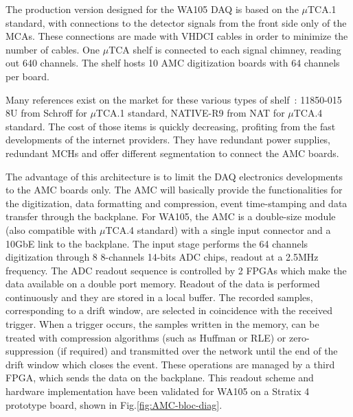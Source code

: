 The production version designed for the WA105 DAQ is based on the $\mu$TCA.1 standard, with connections to the detector signals from the front side only of the MCAs. These connections are made with VHDCI cables in order to minimize the number of cables. One $\mu$TCA shelf is connected to each signal chimney, reading out 640 channels.  The shelf hosts 10 AMC digitization boards with 64 channels per board.


Many references exist on the market for these various types of shelf~: 11850-015 8U from Schroff for $\mu$TCA.1 standard, NATIVE-R9 from NAT for $\mu$TCA.4 standard. The cost of those items is quickly decreasing, profiting from the fast developments of the internet providers. They have redundant power supplies, redundant MCHs and offer different segmentation to connect the AMC boards.  



The advantage of this architecture is to limit the DAQ electronics developments to the AMC boards only. The AMC will basically provide the functionalities for the digitization, data formatting and compression, event time-stamping and data transfer through the backplane. For WA105, the AMC is a double-size module (also compatible with $\mu$TCA.4 standard) with a single input connector and a 10GbE link to the backplane. The input stage performs the 64 channels digitization through 8 8-channels 14-bits ADC chips, readout at a 2.5MHz frequency. The ADC readout sequence is controlled by 2 FPGAs which make the data available on a double port memory. Readout of the data is performed continuously and they are stored in a local buffer. The recorded samples, corresponding to a drift window, are selected in coincidence with the received trigger. When a trigger occurs, the samples written in the memory, can be treated with compression algorithms (such as Huffman or RLE) or zero-suppression (if required) and transmitted over the network until the end of the drift window which closes the event. These operations are managed by a third FPGA, which sends the data on the backplane.  This readout scheme and hardware implementation have been validated for WA105 on a Stratix 4 prototype board, shown in Fig.\ref{fig:AMC-bloc-diag}.

